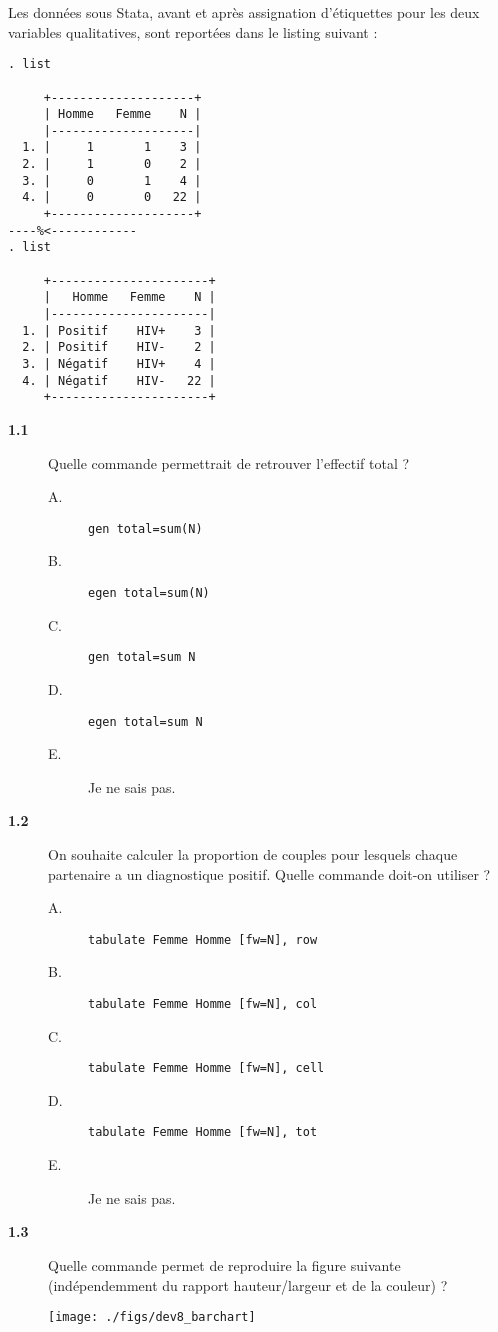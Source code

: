 Les données sous Stata, avant et après assignation d'étiquettes pour les
deux variables qualitatives, sont reportées dans le listing suivant :
\begin{verbatim}
. list

     +--------------------+
     | Homme   Femme    N |
     |--------------------|
  1. |     1       1    3 |
  2. |     1       0    2 |
  3. |     0       1    4 |
  4. |     0       0   22 |
     +--------------------+
----%<------------
. list

     +----------------------+
     |   Homme   Femme    N |
     |----------------------|
  1. | Positif    HIV+    3 |
  2. | Positif    HIV-    2 |
  3. | Négatif    HIV+    4 |
  4. | Négatif    HIV-   22 |
     +----------------------+
\end{verbatim}
\begin{description}
\item[\bf 1.1] Quelle commande permettrait de retrouver l'effectif total ?
  \begin{description}
  \item[A.] \verb|gen total=sum(N)|
  \item[B.] \verb|egen total=sum(N)|
  \item[C.] \verb|gen total=sum N|
  \item[D.] \verb|egen total=sum N|
  \item[E.] Je ne sais pas.
  \end{description}  
\item[\bf 1.2] On souhaite calculer la proportion de couples pour lesquels
  chaque partenaire a un diagnostique positif. Quelle commande doit-on
  utiliser ?  
  \begin{description}
  \item[A.] \verb|tabulate Femme Homme [fw=N], row|
  \item[B.] \verb|tabulate Femme Homme [fw=N], col|
  \item[C.] \verb|tabulate Femme Homme [fw=N], cell|
  \item[D.] \verb|tabulate Femme Homme [fw=N], tot|
  \item[E.] Je ne sais pas.
  \end{description}  
\item[\bf 1.3] Quelle commande permet de reproduire la figure suivante
  (indépendemment du rapport hauteur/largeur et de la couleur) ?
  \begin{center}
    \texttt{[image: ./figs/dev8\_barchart]}

\end{center}
\end{description}
